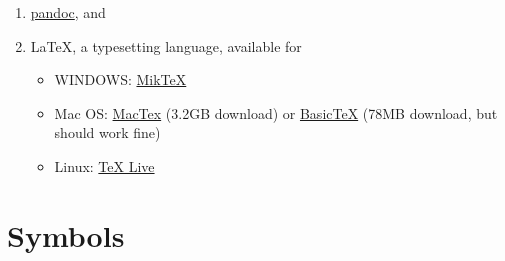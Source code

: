 \documentclass[
]{book}
\providecommand{\tightlist}{%
  \setlength{\itemsep}{0pt}\setlength{\parskip}{0pt}}
\begin{document}
\begin{enumerate}
\def\labelenumi{\arabic{enumi}.}
\tightlist
\item
  \href{http://pandoc.org/installing.html}{pandoc}, and
\item
  LaTeX, a typesetting language, available for

  \begin{itemize}
  \tightlist
  \item
    WINDOWS: \href{http://miktex.org/}{MikTeX}
  \item
    Mac OS: \href{https://tug.org/mactex/downloading.html}{MacTex} (3.2GB download) or \href{http://ww.tug.org/mactex/morepackages.html}{BasicTeX} (78MB download, but should work fine)
  \item
    Linux: \href{https://www.tug.org/texlive/}{TeX Live}
  \end{itemize}
\end{enumerate}

\hypertarget{symbols}{%
\chapter{Symbols}\label{symbols}}
\end{document}
